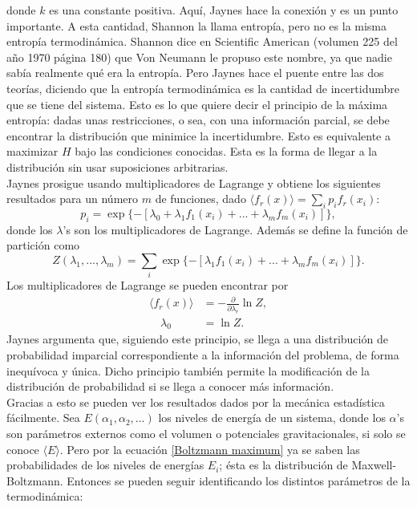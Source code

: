 donde $k$ es una constante positiva. Aquí, Jaynes hace la conexión y es un punto importante. A esta cantidad, Shannon la llama entropía, pero no es la misma entropía termodinámica. Shannon dice en Scientific American (volumen 225 del año 1970  página 180) que Von Neumann le propuso este nombre, ya que nadie sabía realmente qué era la entropía. Pero Jaynes hace el puente entre las dos teorías, diciendo que la entropía termodinámica es la cantidad de incertidumbre que se tiene del sistema. Esto es lo que quiere decir el principio de la máxima entropía: dadas unas restricciones, o sea, con una información parcial, se debe encontrar la distribución que minimice la incertidumbre. Esto es equivalente a maximizar $H$ bajo las condiciones conocidas. Esta es la forma de llegar a la distribución sin usar suposiciones arbitrarias.
\\
Jaynes prosigue usando multiplicadores de Lagrange y obtiene los siguientes resultados para un número $m$ de funciones, dado  $\langle f_{r}(x) \rangle = \sum_{i} p_{i} f_{r} (x_{i})$:
\begin{equation} \label{Boltzmann maximum}
p_{i}= \exp \{ -[\lambda_{0}+ \lambda_{1}f_{1}(x_{i})+...+\lambda_{m} f_{m}(x_{i})] \},
\end{equation}
donde los $\lambda$'s son los multiplicadores de Lagrange. Además se define la función de partición como
\begin{equation}
Z(\lambda_{1},...,\lambda_{m})=\sum_{i} \exp \{ -[ \lambda_{1}f_{1}(x_{i})+...+\lambda_{m} f_{m}(x_{i})] \}.
\end{equation}
Los multiplicadores de Lagrange se pueden encontrar por
\begin{align*}
\langle f_{r}(x) \rangle  &= - \frac{\partial}{\partial \lambda_{r}} \ln Z, \\
\quad \lambda_{0} &= \ln Z.
\end{align*}
Jaynes argumenta que, siguiendo este principio, se llega a una distribución de probabilidad imparcial correspondiente a la información del problema, de forma inequívoca y única. Dicho principio también permite la modificación de la distribución de probabilidad si se llega a conocer más información.
\\
Gracias a esto se pueden ver los resultados dados por la mecánica estadística fácilmente. Sea $E(\alpha_{1},\alpha_{2},...)$ los niveles de energía de un sistema, donde los $\alpha$'s son parámetros externos como el volumen o potenciales gravitacionales, si solo se conoce $\langle E \rangle $. Pero por la ecuación \ref{Boltzmann maximum} ya se saben las probabilidades de los niveles de energías $E_{i}$; ésta es la distribución de Maxwell-Boltzmann. Entonces se pueden seguir identificando los distintos parámetros de la termodinámica:
